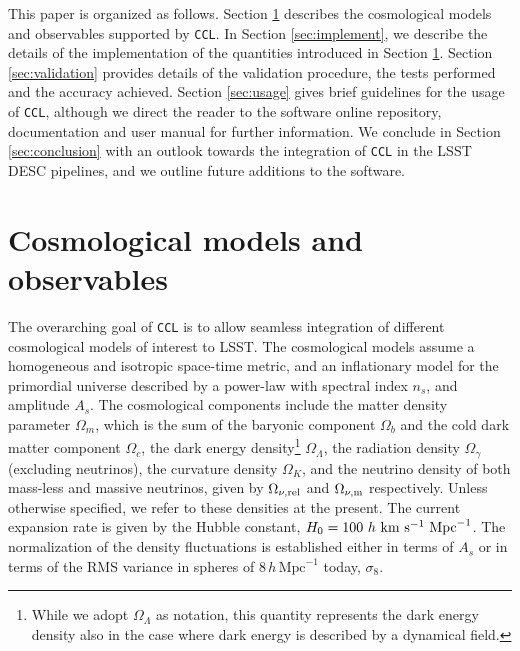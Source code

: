 \documentclass[\docopts]{\docclass}
\newcommand{\ccl}{{\tt CCL}\xspace}
\begin{document}
This paper is organized as follows. Section \ref{sec:models} describes the cosmological models and observables supported by \ccl. In Section \ref{sec:implement}, we describe the details of the implementation of the quantities introduced in Section \ref{sec:models}. Section \ref{sec:validation} provides details of the validation procedure, the tests performed and the accuracy achieved. Section \ref{sec:usage} gives brief guidelines for the usage of \ccl, although we direct the reader to the software online repository, documentation and user manual for further information. We conclude in Section \ref{sec:conclusion} with an outlook towards the integration of \ccl in the LSST DESC pipelines, and we outline future additions to the software. 


\section{Cosmological models and observables}
\label{sec:models}

The overarching goal of \ccl is to allow seamless integration of different cosmological models of interest to LSST. The cosmological models assume a homogeneous and isotropic space-time metric, and an inflationary model for the primordial universe described by a power-law with spectral index $n_s$, and amplitude $A_s$. The cosmological components include the matter density parameter $\Omega_m$, which is the sum of the baryonic component $\Omega_b$ and the cold dark matter component $\Omega_c$, the dark energy density\footnote{While we adopt $\Omega_\Lambda$ as notation, this quantity represents the dark energy density also in the case where dark energy is described by a dynamical field.} $\Omega_\Lambda$, the radiation density $\Omega_\gamma$ (excluding neutrinos), the curvature density $\Omega_K$, and the neutrino density of both mass-less and massive neutrinos, given by $\Omega_{\nu, {\rm rel}}$ and $\Omega_{\nu, {\rm m}}$ respectively. Unless otherwise specified, we refer to these densities at the present. The current expansion rate is given by the Hubble constant, $H_0 = 100~h~{\rm km}~{\rm s}^{-1}~{\rm Mpc}^{-1}$. The normalization of the density fluctuations is established either in terms of $A_s$ or in terms of the RMS variance in spheres of $8\,h\,\text{Mpc}^{-1}$ today, $\sigma_8$. 
\end{document}
